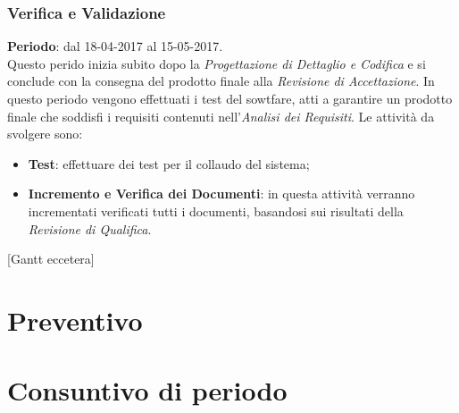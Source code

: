 	\subsubsection{Verifica e Validazione}
	\textbf{Periodo}: dal 18-04-2017 al 15-05-2017.
	\\ Questo perido inizia subito dopo la \textit{Progettazione di Dettaglio e Codifica} e si conclude con la consegna del prodotto finale alla \textit{Revisione di Accettazione}.
	In questo periodo vengono effettuati i test del sowtfare, atti a garantire un prodotto finale che soddisfi i requisiti contenuti nell'\textit{Analisi dei Requisiti}.
	Le attività da svolgere sono:
	\begin{itemize}
		\item \textbf{Test}: effettuare dei test per il collaudo del sistema;
		\item \textbf{Incremento e Verifica dei Documenti}: in questa attività verranno incrementati verificati tutti i documenti, basandosi sui risultati della \textit{Revisione di Qualifica}.
	\end{itemize}
	[Gantt eccetera]	
	\section{Preventivo}
\section{Consuntivo di periodo}


